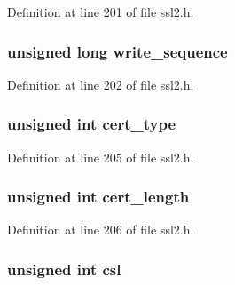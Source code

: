 Definition at line 201 of file ssl2.\+h.

\subsubsection[{\texorpdfstring{write\+\_\+sequence}{write_sequence}}]{\setlength{\rightskip}{0pt plus 5cm}unsigned long write\+\_\+sequence}\hypertarget{structssl2__state__st_a0e6dc54a98fa9135fdd12766dac543f8}{}\label{structssl2__state__st_a0e6dc54a98fa9135fdd12766dac543f8}


Definition at line 202 of file ssl2.\+h.

\subsubsection[{\texorpdfstring{cert\+\_\+type}{cert_type}}]{\setlength{\rightskip}{0pt plus 5cm}unsigned int cert\+\_\+type}\hypertarget{structssl2__state__st_a2bb1c4376b0c853c73d46703160f6c88}{}\label{structssl2__state__st_a2bb1c4376b0c853c73d46703160f6c88}


Definition at line 205 of file ssl2.\+h.

\subsubsection[{\texorpdfstring{cert\+\_\+length}{cert_length}}]{\setlength{\rightskip}{0pt plus 5cm}unsigned int cert\+\_\+length}\hypertarget{structssl2__state__st_a2583fe8e969237d09f449af15d6a3c06}{}\label{structssl2__state__st_a2583fe8e969237d09f449af15d6a3c06}


Definition at line 206 of file ssl2.\+h.

\subsubsection[{\texorpdfstring{csl}{csl}}]{\setlength{\rightskip}{0pt plus 5cm}unsigned int csl}\hypertarget{structssl2__state__st_a2c7f3ea29ea669ae52d434ccc6046b9c}{}\label{structssl2__state__st_a2c7f3ea29ea669ae52d434ccc6046b9c}


